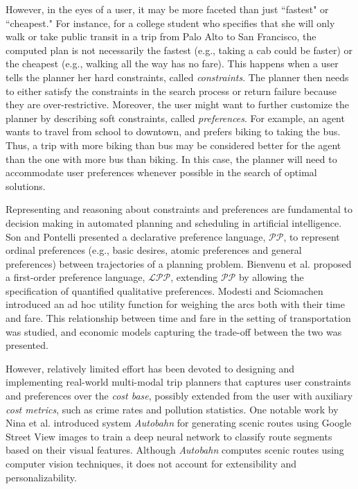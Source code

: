 \documentclass[letterpaper]{article}
\newcommand{\tit}[1]{\textit{#1}}
\begin{document}
However, in the eyes of a user, it may be more faceted than just
``fastest" or ``cheapest."
For instance, for a college student who specifies that she will
only walk or take public transit in a trip from Palo Alto to
San Francisco, the computed plan is not necessarily the fastest
(e.g., taking a cab could be faster)
or the cheapest (e.g., walking all the way has no fare).
This happens when a user tells the planner her hard constraints,
called \tit{constraints}.  
The planner then needs to either satisfy the 
constraints in the search process or return failure because they are
over-restrictive.
Moreover, the user might want to further customize the planner by
describing soft constraints, called \tit{preferences}.
For example, an agent wants to travel from school to
downtown, and prefers biking to taking the bus.
Thus, a trip with more biking than bus may be considered better for
the agent than the one with more bus than biking.
In this case, the planner will need to accommodate user preferences
whenever possible in the search of optimal solutions.

Representing and reasoning about constraints and preferences are
fundamental to decision making in automated planning and scheduling
in artificial intelligence.
Son and Pontelli presented a declarative preference language, 
$\mathcal{PP}$, to represent ordinal preferences (e.g., basic desires,
atomic preferences and general preferences) between trajectories of 
a planning problem\cite{son2004planning}.
Bienvenu et al. proposed a first-order preference language, $\mathcal{LPP}$, 
extending $\mathcal{PP}$ by allowing the specification of quantified qualitative
preferences\cite{bienvenu2011specifying}.
Modesti and Sciomachen introduced an ad hoc utility function for weighing
the arcs both with their time and fare\cite{modesti1998utility}.
This relationship between time and fare in the setting of transportation
was studied, and economic models capturing the trade-off between the two
was presented\cite{antoniou2007methodology}.

However, relatively limited effort has been devoted to designing and
implementing real-world multi-modal trip planners that captures user
constraints and preferences over the \tit{cost base}, possibly
extended from the user with auxiliary \tit{cost metrics},
such as crime rates and pollution statistics.
One notable work by Nina et al.\cite{nina2016no} introduced
system \tit{Autobahn} for generating scenic routes using
Google Street View images to train a deep neural network
to classify route segments based on their visual features.
Although \tit{Autobahn} computes scenic routes using computer
vision techniques, it does not account for extensibility
and personalizability.
\end{document}
